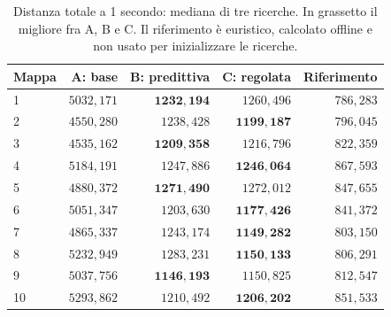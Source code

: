 \begin{table}[!htbp]
\centering\small
\caption{Distanza totale a 1 secondo: mediana di tre ricerche. In grassetto il migliore fra A, B e C. Il riferimento è euristico, calcolato offline e non usato per inizializzare le ricerche.}\label{tab:costs1}
\begin{tabular}{lrrrr}
\toprule
Mappa & A: base & B: predittiva & C: regolata & Riferimento\\
\midrule
1 & $5032{,}171$ & $\mathbf{1232{,}194}$ & $1260{,}496$ & $786{,}283$\\
2 & $4550{,}280$ & $1238{,}428$ & $\mathbf{1199{,}187}$ & $796{,}045$\\
3 & $4535{,}162$ & $\mathbf{1209{,}358}$ & $1216{,}796$ & $822{,}359$\\
4 & $5184{,}191$ & $1247{,}886$ & $\mathbf{1246{,}064}$ & $867{,}593$\\
5 & $4880{,}372$ & $\mathbf{1271{,}490}$ & $1272{,}012$ & $847{,}655$\\
6 & $5051{,}347$ & $1203{,}630$ & $\mathbf{1177{,}426}$ & $841{,}372$\\
7 & $4865{,}337$ & $1243{,}174$ & $\mathbf{1149{,}282}$ & $803{,}150$\\
8 & $5232{,}949$ & $1283{,}231$ & $\mathbf{1150{,}133}$ & $806{,}291$\\
9 & $5037{,}756$ & $\mathbf{1146{,}193}$ & $1150{,}825$ & $812{,}547$\\
10 & $5293{,}862$ & $1210{,}492$ & $\mathbf{1206{,}202}$ & $851{,}533$\\
\bottomrule
\end{tabular}
\end{table}
